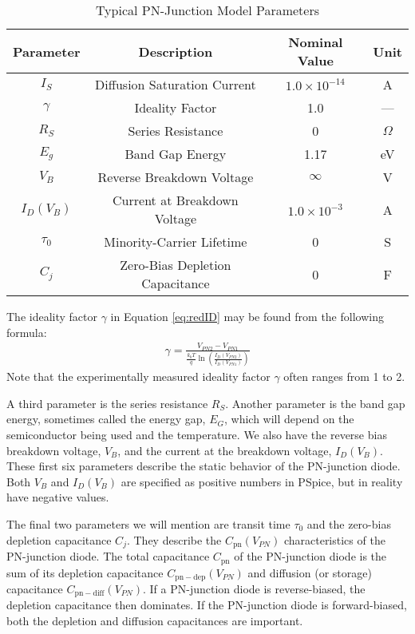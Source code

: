 \documentclass[12pt]{../manual}
\begin{document}
\begin{table}[ht!]
\caption{Typical PN-Junction Model Parameters}
\centering
\begin{tabular}{|c|c|c|c|} \hline
Parameter & Description & Nominal Value & Unit \\ \hline \hline
$I_S$ & Diffusion Saturation Current & $1.0 \times 10^{-14}$ & A \\ \hline
$\gamma$ & Ideality Factor & 1.0 & --- \\ \hline
$R_S$ & Series Resistance & 0 & $\Omega$ \\ \hline
$E_g$ & Band Gap Energy & 1.17 & eV \\ \hline
$V_B$ & Reverse Breakdown Voltage & $\infty$ & V \\ \hline
$I_D(V_B)$ & Current at Breakdown Voltage & $1.0 \times 10^{-3}$ & A \\ \hline
$\tau_0$ & Minority-Carrier Lifetime & 0 & S \\ \hline
$C_j$ & Zero-Bias Depletion Capacitance & 0 & F \\ \hline
\end{tabular}
\end{table}

The ideality factor $\gamma$ in Equation \ref{eq:redID} may be found from the following formula:
\begin{align}
\gamma = \frac{V_{PN2} - V_{PN1}}{\frac{k_bT}{q}\ln\left(\frac{I_D(V_{PN2})}{I_D(V_{PN1})}\right)}
\end{align}
Note that the experimentally measured ideality factor $\gamma$ often ranges from 1 to 2.

A third parameter is the series resistance $R_S$. Another parameter is the band gap energy, sometimes called the energy gap, $E_G$, which will depend on the semiconductor being used and the temperature. We also have the reverse bias breakdown voltage, $V_B$, and the current at the breakdown voltage, $I_D(V_B)$. These first six parameters describe the static behavior of the PN-junction diode. Both $V_B$ and $I_D(V_B)$ are specified as positive numbers in PSpice, but in reality have negative values.

The final two parameters we will mention are transit time $\tau_0$ and the zero-bias depletion capacitance $C_j$. They describe the $C_{\mathrm{pn}}(V_{PN})$ characteristics of the PN-junction diode. The total capacitance $C_{\mathrm{pn}}$ of the PN-junction diode is the sum of its depletion capacitance $C_{\mathrm{pn-dep}}(V_{PN})$ and diffusion (or storage) capacitance $C_{\mathrm{pn-diff}}(V_{PN})$. If a PN-junction diode is reverse-biased, the depletion capacitance then dominates. If the PN-junction diode is forward-biased, both the depletion and diffusion capacitances are important.
\end{document}
